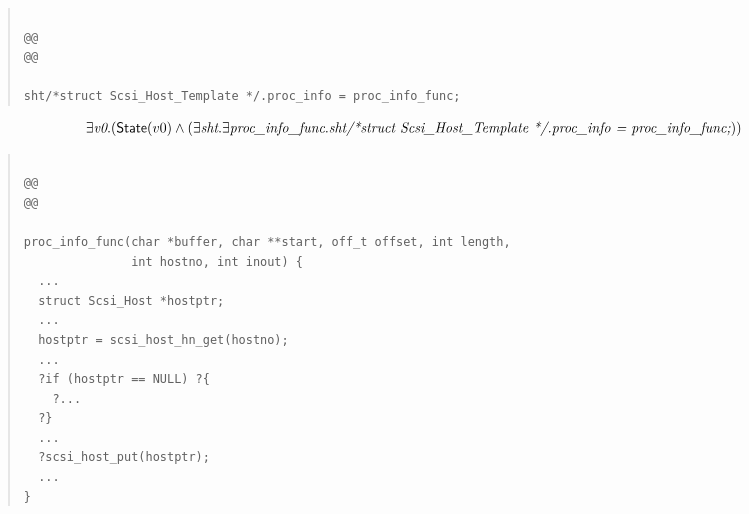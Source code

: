 \documentclass{article}
\newcommand{\mita}[1]{\mbox{\it{{#1}}}}
\newcommand{\msf}[1]{\mbox{\sf{{#1}}}}
\begin{document}
\begin{quote}\begin{verbatim}

@@
@@

sht/*struct Scsi_Host_Template */.proc_info = proc_info_func;
\end{verbatim}\end{quote}

\[\begin{array}{l}
\exists \mita{v0} . (\msf{State}(v0) \wedge (\exists \mita{sht} . \exists \mita{proc\_info\_func} . \mita{sht/*struct Scsi\_Host\_Template */.proc\_info = proc\_info\_func;}))
\end{array}\]

\begin{quote}\begin{verbatim}

@@
@@

proc_info_func(char *buffer, char **start, off_t offset, int length,
               int hostno, int inout) {
  ...
  struct Scsi_Host *hostptr;
  ...
  hostptr = scsi_host_hn_get(hostno);
  ...
  ?if (hostptr == NULL) ?{
    ?...
  ?}
  ...
  ?scsi_host_put(hostptr);
  ...
}
\end{verbatim}\end{quote}
\end{document}
